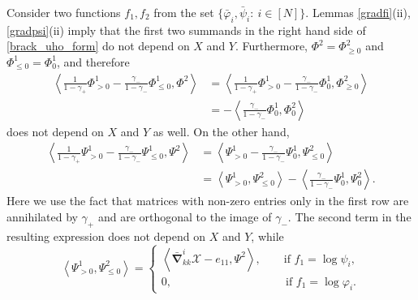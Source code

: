 \documentclass{amsart}
\theoremstyle{definition}
\theoremstyle{remark}
\numberwithin{equation}{section}
\numberwithin{theorem}{section}
\begin{document}
Consider two functions $f_1, f_2$ from the set $\{\bar{{\varphi}}_i, \bar{{\psi}}_i{{:\ }} i\in[N]\}$.
Lemmas \ref{gradfi}(ii), \ref{gradpsi}(ii) 
imply that the 
first two summands in the right hand side of \eqref{brack_uho_form} do not depend on $X$ and $Y$.
Furthermore, ${\Phi}^2={\Phi}^2_{\geq 0}$ and ${\Phi}^1_{\leq 0}={\Phi}^1_{0}$, and therefore
\begin{equation}
\label{aux3}
\begin{aligned}
\left \langle  \frac{1}{1-\gamma_+} 
{\Phi}^1_{>0} - \frac{\gamma_-}{1-\gamma_-}{\Phi}^1_{\leq 0}, {\Phi}^2 \right \rangle&=
\left \langle  \frac{1}{1-\gamma_+} 
{\Phi}^1_{>0} - \frac{\gamma_-}{1-\gamma_-}{\Phi}^1_{0}, {\Phi}^2_{\geq 0} \right \rangle\\
&= - \left \langle \frac{\gamma_-}{1-\gamma_-}{\Phi}^1_{0}, {\Phi}^2_{0} \right \rangle
\end{aligned}
\end{equation}
does not depend on $X$ and $Y$ as well. On the other hand,
\begin{equation}
\label{aux4}
\begin{aligned}
\left \langle  \frac{1}{1-\gamma_+} 
{\Psi}^1_{>0} - \frac{\gamma_-}{1-\gamma_-}{\Psi}^1_{\leq 0}, {\Psi}^2 \right \rangle&=
\left \langle 
{\Psi}^1_{>0} - \frac{\gamma_-}{1-\gamma_-}{\Psi}^1_{0}, {\Psi}^2_{\leq 0} \right \rangle\\
& = \left \langle 
{\Psi}^1_{>0}, {\Psi}^2_{\leq 0} \right \rangle
 - \left \langle \frac{\gamma_-}{1-\gamma_-}{\Psi}^1_{0}, {\Psi}^2_{0} \right \rangle.
\end{aligned}
\end{equation}
Here we use the fact that  matrices with non-zero entries only in the first row are  
annihilated by $\gamma_+$ and are orthogonal  to the image of $\gamma_-$.
The second term in the resulting expression does not depend on $X$ and $Y$, while 
\begin{equation}\label{psipsi}
\left \langle 
\Psi^1_{>0}, \Psi^2_{\leq 0} \right \rangle=
\begin{cases}
\left \langle 
\bar{\boldsymbol\nabla}^i_{kk}{{\mathcal X}}-e_{11},{\Psi}^2 \right \rangle,\qquad\text{if   $f_1=\log{{\psi}}_i$},\\
0,\qquad\qquad\qquad\qquad\qquad \text{if $f_1=\log{{\varphi}}_i$}. 
 \end{cases}
\end{equation}
\end{document}
